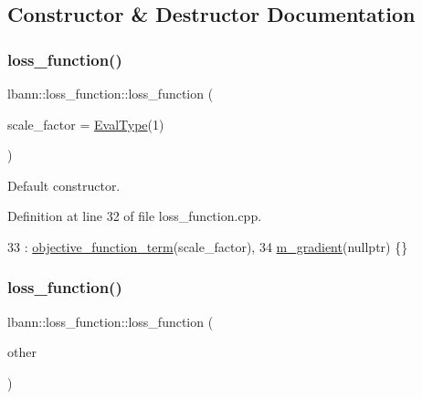 \subsection{Constructor \& Destructor Documentation}
\mbox{\label{classlbann_1_1loss__function_a0c5745e661c59e3e5496888d233c07cf}} 
\subsubsection{\texorpdfstring{loss\+\_\+function()}{loss\_function()}\hspace{0.1cm}{\footnotesize\ttfamily [1/2]}}
{\footnotesize\ttfamily lbann\+::loss\+\_\+function\+::loss\+\_\+function (\begin{DoxyParamCaption}\item[{\hyperlink{base_8hpp_a3266f5ac18504bbadea983c109566867}{Eval\+Type}}]{scale\+\_\+factor = {\ttfamily \hyperlink{base_8hpp_a3266f5ac18504bbadea983c109566867}{Eval\+Type}(1)} }\end{DoxyParamCaption})}

Default constructor. 

Definition at line 32 of file loss\+\_\+function.\+cpp.


\begin{DoxyCode}
33   : \hyperlink{classlbann_1_1objective__function__term_a8c019e3c880f38dc20275e395acaeca1}{objective\_function\_term}(scale\_factor),
34     \hyperlink{classlbann_1_1loss__function_ac6ac9f8f2cef7a4daa1b282dba914975}{m\_gradient}(\textcolor{keyword}{nullptr}) \{\}
\end{DoxyCode}
\mbox{\label{classlbann_1_1loss__function_aaebcff849004392decc9850c4c75ead5}} 
\subsubsection{\texorpdfstring{loss\+\_\+function()}{loss\_function()}\hspace{0.1cm}{\footnotesize\ttfamily [2/2]}}
{\footnotesize\ttfamily lbann\+::loss\+\_\+function\+::loss\+\_\+function (\begin{DoxyParamCaption}\item[{const \hyperlink{classlbann_1_1loss__function}{loss\+\_\+function} \&}]{other }\end{DoxyParamCaption})}

